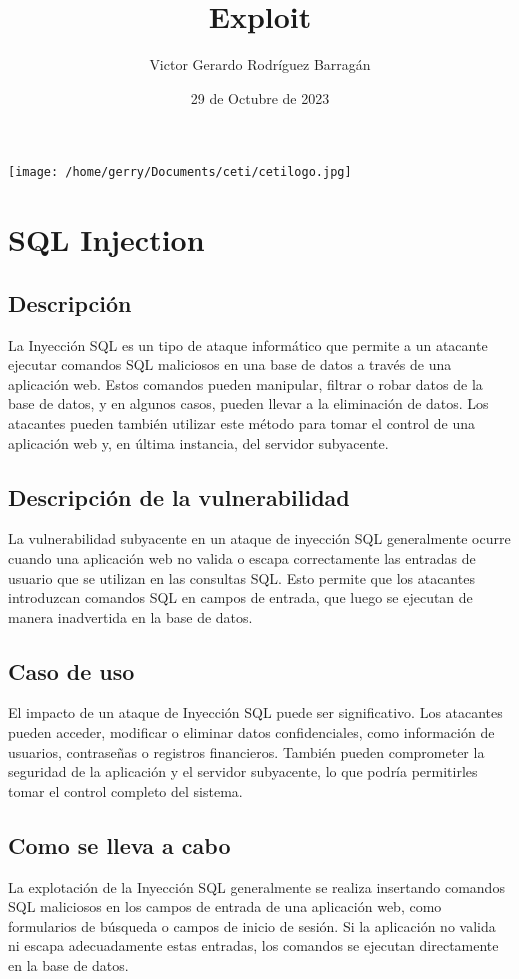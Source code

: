 \documentclass{article}
\title{Exploit}
\author{Victor Gerardo Rodríguez Barragán}
\date{29 de Octubre de 2023}
\begin{document}
\maketitle
\begin{center}
    \texttt{[image: /home/gerry/Documents/ceti/cetilogo.jpg]}
\end{center}

\newpage
\justify
\section{SQL Injection}
\subsection{Descripción}
La Inyección SQL es un tipo de ataque informático que permite a un atacante ejecutar comandos SQL maliciosos en una base de datos a través de una aplicación web. Estos comandos pueden manipular, filtrar o robar datos de la base de datos, y en algunos casos, pueden llevar a la eliminación de datos. Los atacantes pueden también utilizar este método para tomar el control de una aplicación web y, en última instancia, del servidor subyacente.
\subsection{Descripción de la vulnerabilidad}
La vulnerabilidad subyacente en un ataque de inyección SQL generalmente ocurre cuando una aplicación web no valida o escapa correctamente las entradas de usuario que se utilizan en las consultas SQL. Esto permite que los atacantes introduzcan comandos SQL en campos de entrada, que luego se ejecutan de manera inadvertida en la base de datos.
\subsection{Caso de uso}
El impacto de un ataque de Inyección SQL puede ser significativo. Los atacantes pueden acceder, modificar o eliminar datos confidenciales, como información de usuarios, contraseñas o registros financieros. También pueden comprometer la seguridad de la aplicación y el servidor subyacente, lo que podría permitirles tomar el control completo del sistema.
\subsection{Como se lleva a cabo}
La explotación de la Inyección SQL generalmente se realiza insertando comandos SQL maliciosos en los campos de entrada de una aplicación web, como formularios de búsqueda o campos de inicio de sesión. Si la aplicación no valida ni escapa adecuadamente estas entradas, los comandos se ejecutan directamente en la base de datos.
\end{document}

